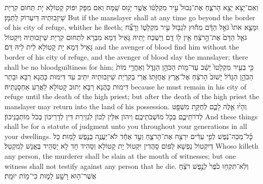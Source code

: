 {וְאִם־יָצֹ֥א יֵצֵ֖א הָרֹצֵ֑חַ אֶת־גְּבוּל֙ עִ֣יר מִקְלָט֔וֹ אֲשֶׁ֥ר יָנ֖וּס שָֽׁמָּה׃}
{וְאִם מִפָּק יִפּוֹק קָטוֹלָא יָת תְּחוּם קִרְיַת שֵׁיזָבוּתֵיהּ דְּיִעְרוֹק לְתַמָּן׃}
{But if the manslayer shall at any time go beyond the border of his city of refuge, whither he fleeth;}{}
{וּמָצָ֤א אֹתוֹ֙ גֹּאֵ֣ל הַדָּ֔ם מִח֕וּץ לִגְב֖וּל עִ֣יר מִקְלָט֑וֹ וְרָצַ֞ח גֹּאֵ֤ל הַדָּם֙ אֶת־הָ֣רֹצֵ֔חַ אֵ֥ין ל֖וֹ דָּֽם׃
}
{וְיַשְׁכַּח יָתֵיהּ גָּאֵיל דְּמָא מִבַּרָא לִתְחוּם קִרְיַת שֵׁיזָבוּתֵיהּ וְיִקְטוֹל גָּאֵיל דְּמָא יָת קָטוֹלָא לֵית לֵיהּ דַּם׃}
{and the avenger of blood find him without the border of his city of refuge, and the avenger of blood slay the manslayer; there shall be no bloodguiltiness for him;}{}
{כִּ֣י בְעִ֤יר מִקְלָטוֹ֙ יֵשֵׁ֔ב עַד־מ֖וֹת הַכֹּהֵ֣ן הַגָּדֹ֑ל וְאַחֲרֵ֥י מוֹת֙ הַכֹּהֵ֣ן הַגָּדֹ֔ל יָשׁוּב֙ הָרֹצֵ֔חַ אֶל־אֶ֖רֶץ אֲחֻזָּתֽוֹ׃}
{אֲרֵי בְקִרְיַת שֵׁיזָבוּתֵיהּ יִתֵּיב עַד דִּימוּת כָּהֲנָא רַבָּא וּבָתַר דִּימוּת כָּהֲנָא רַבָּא יְתוּב קָטוֹלָא לַאֲרַע אַחְסָנְתֵיהּ׃}
{because he must remain in his city of refuge until the death of the high priest; but after the death of the high priest the manslayer may return into the land of his possession.}{}
{וְהָי֨וּ אֵ֧לֶּה לָכֶ֛ם לְחֻקַּ֥ת מִשְׁפָּ֖ט לְדֹרֹתֵיכֶ֑ם בְּכֹ֖ל מוֹשְׁבֹתֵיכֶֽם׃
}
{וִיהוֹן אִלֵּין לְכוֹן לִגְזֵירַת דִּין לְדָרֵיכוֹן בְּכֹל מוֹתְבָנֵיכוֹן׃}
{And these things shall be for a statute of judgment unto you throughout your generations in all your dwellings.}{}
{כׇּ֨ל־מַכֵּה־נֶ֔פֶשׁ לְפִ֣י עֵדִ֔ים יִרְצַ֖ח אֶת־הָרֹצֵ֑חַ וְעֵ֣ד אֶחָ֔ד לֹא־יַעֲנֶ֥ה בְנֶ֖פֶשׁ לָמֽוּת׃
}
{כָּל דְּיִקְטוֹל נַפְשָׁא לְפוֹם סָהֲדִין יִקְטוֹל יָת קָטוֹלָא וְסָהִיד חַד לָא יַסְהֵיד בֶּאֱנָשׁ לְמִקְטַל׃}
{Whoso killeth any person, the murderer shall be slain at the mouth of witnesses; but one witness shall not testify against any person that he die.}{}
{וְלֹֽא־תִקְח֥וּ כֹ֙פֶר֙ לְנֶ֣פֶשׁ רֹצֵ֔חַ אֲשֶׁר־ה֥וּא רָשָׁ֖ע לָמ֑וּת כִּי־מ֖וֹת יוּמָֽת׃
}
